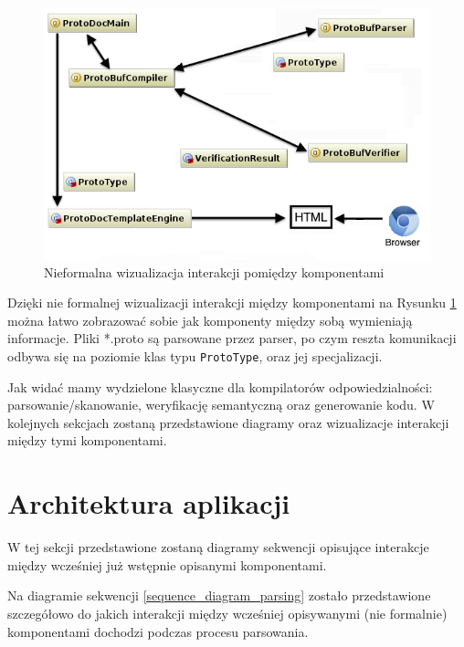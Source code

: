 \documentclass[pdflatex,11pt]{aghdpl}
\begin{document}
\begin{figure}[ch!]
\begin{center}
 \includegraphics[scale=0.85]{main_classes.png}
\end{center}
\label{simple_visualization}
\caption{Nieformalna wizualizacja interakcji pomiędzy komponentami}
\end{figure}

Dzięki nie formalnej wizualizacji interakcji między komponentami na Rysunku \ref{simple_visualization} można łatwo zobrazować sobie
jak komponenty między sobą wymieniają informacje. Pliki *.proto są parsowane przez parser, po czym reszta komunikacji odbywa się na poziomie 
klas typu \verb|ProtoType|, oraz jej specjalizacji.

Jak widać mamy wydzielone klasyczne dla kompilatorów odpowiedzialności: parsowanie/skanowanie, weryfikację semantyczną oraz generowanie kodu.
W kolejnych sekcjach zostaną przedstawione diagramy oraz wizualizacje interakcji między tymi komponentami.

\newpage
\section{Architektura aplikacji}
\label{sec:sequence_diagrams}

W tej sekcji przedstawione zostaną diagramy sekwencji opisujące interakcje między wcześniej już wstępnie opisanymi komponentami.



Na diagramie sekwencji  \ref{sequence_diagram_parsing} zostało przedstawione szczegółowo do jakich interakcji między wcześniej opisywanymi (nie formalnie)
komponentami dochodzi podczas procesu parsowania. 
\end{document}
